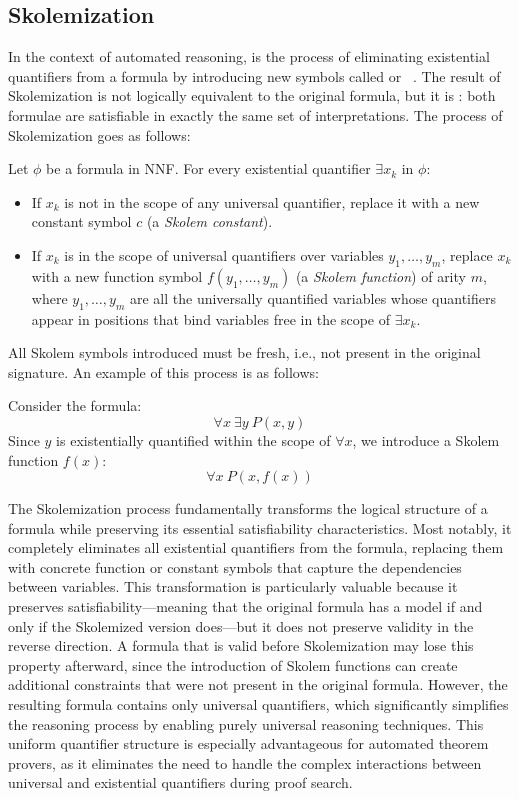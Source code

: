 \subsection{Skolemization}\label{subsec:skolemization}
In the context of automated reasoning,  is the process of eliminating existential quantifiers from a formula by introducing new symbols called  or ~\cite{skolem1920}.  
The result of Skolemization is not logically equivalent to the original formula, but it is : both formulae are satisfiable in exactly the same set of interpretations.
The process of Skolemization goes as follows:

Let \(\phi\) be a formula in NNF\@. For every existential quantifier \(\exists x_k\) in \(\phi\):
\begin{itemize}
  \item If \(x_k\) is not in the scope of any universal quantifier, replace it with a new constant symbol \(c\) (a \emph{Skolem constant}).
  \item If \(x_k\) is in the scope of universal quantifiers over variables \(y_1, \dots, y_m\), replace \(x_k\) with a new function symbol \(f(y_1, \dots, y_m)\) (a \emph{Skolem function}) of arity \(m\), where \(y_1, \dots, y_m\) are all the universally quantified variables whose quantifiers appear in positions that bind variables free in the scope of \(\exists x_k\).
\end{itemize}
All Skolem symbols introduced must be fresh, i.e., not present in the original signature.
An example of this process is as follows:

Consider the formula:
\[
\forall x \: \exists y \: P(x, y)
\]
Since \(y\) is existentially quantified within the scope of \(\forall x\), we introduce a Skolem function \(f(x)\):
\[
\forall x \: P(x, f(x))
\]

The Skolemization process fundamentally transforms the logical structure of a formula while preserving its essential satisfiability characteristics.
Most notably, it completely eliminates all existential quantifiers from the formula, replacing them with concrete function or constant symbols that capture the dependencies between variables.
This transformation is particularly valuable because it preserves satisfiability—meaning that the original formula has a model if and only if the Skolemized version does—but it does not preserve validity in the reverse direction.
A formula that is valid before Skolemization may lose this property afterward, since the introduction of Skolem functions can create additional constraints that were not present in the original formula.
However, the resulting formula contains only universal quantifiers, which significantly simplifies the reasoning process by enabling purely universal reasoning techniques. 
This uniform quantifier structure is especially advantageous for automated theorem provers, as it eliminates the need to handle the complex interactions between universal and existential quantifiers during proof search.

